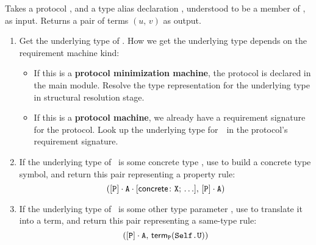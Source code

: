 \documentclass[../generics]{subfiles}
\begin{document}
\begin{algorithm}\label{build rule alias}
Takes a protocol \tP, and a type alias declaration \nA, understood to be a member of \tP, as input. Returns a pair of terms $(u,\,v)$ as output.
\begin{enumerate}
\item Get the underlying type of \nA. How we get the underlying type depends on the requirement machine kind:
\begin{itemize}
\item If this is a \textbf{protocol minimization machine}, the protocol is declared in the main module. Resolve the type representation for the underlying type in structural resolution stage.

\item If this is a \textbf{protocol machine}, we already have a requirement signature for the protocol. Look up the underlying type for~\nA\ in the protocol's requirement signature.
\end{itemize}
\item If the underlying type of \nA\ is some concrete type \tX, use  to build a concrete type symbol, and return this pair representing a property rule:
\[([\texttt{P}] \cdot \texttt{A} \cdot [\mathsf{concrete}\colon \texttt{X};\,\ldots],\, [\texttt{P}] \cdot \texttt{A})\]
\item If the underlying type of \nA\ is some other type parameter \SelfU, use  to translate it into a term, and return this pair representing a same-type rule:
\[([\texttt{P}] \cdot \texttt{A},\, \mathsf{term}_{\texttt{P}}(\texttt{Self.U}))\]
\end{enumerate}
\end{algorithm}

\newcommand{\pPair}{\protosym{Pair}}
\newcommand{\pGraph}{\protosym{Graph}}
\newcommand{\nEl}{\texttt{Elt}}
\newcommand{\nEd}{\texttt{Edge}}
\newcommand{\nV}{\texttt{Vertex}}
\newcommand{\nES}{\texttt{EdgeSet}}

\newcommand{\aEl}{\assocsym{Pair}{Elt}}
\newcommand{\aEd}{\assocsym{Graph}{Edge}}
\end{document}
